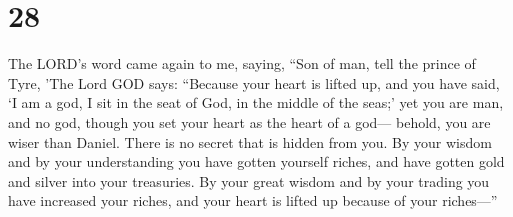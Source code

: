 \hypertarget{section-26}{%
\section{28}\label{section-26}}

 The LORD's word came again to me, saying, 
``Son of man, tell the prince of Tyre, 'The Lord GOD says: ``Because
your heart is lifted up, and you have said, `I am a god, I sit in the
seat of God, in the middle of the seas;' yet you are man, and no god,
though you set your heart as the heart of a god---  behold,
you are wiser than Daniel. There is no secret that is hidden from you.
 By your wisdom and by your understanding you have gotten
yourself riches, and have gotten gold and silver into your treasuries.
 By your great wisdom and by your trading you have increased
your riches, and your heart is lifted up because of your riches---''

